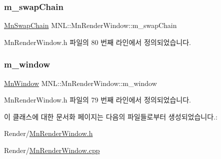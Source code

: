 \subsubsection{\texorpdfstring{m\+\_\+swap\+Chain}{m\_swapChain}}
{\footnotesize\ttfamily \hyperlink{class_m_n_l_1_1_mn_swap_chain}{Mn\+Swap\+Chain} M\+N\+L\+::\+Mn\+Render\+Window\+::m\+\_\+swap\+Chain\hspace{0.3cm}{\ttfamily [private]}}



Mn\+Render\+Window.\+h 파일의 80 번째 라인에서 정의되었습니다.

\mbox{\label{class_m_n_l_1_1_mn_render_window_a15bf07a3fc82d20ef185cf140b7c216e}} 
\subsubsection{\texorpdfstring{m\+\_\+window}{m\_window}}
{\footnotesize\ttfamily \hyperlink{class_m_n_l_1_1_mn_window}{Mn\+Window} M\+N\+L\+::\+Mn\+Render\+Window\+::m\+\_\+window\hspace{0.3cm}{\ttfamily [private]}}



Mn\+Render\+Window.\+h 파일의 79 번째 라인에서 정의되었습니다.



이 클래스에 대한 문서화 페이지는 다음의 파일들로부터 생성되었습니다.\+:\begin{DoxyCompactItemize}
\item 
Render/\hyperlink{_mn_render_window_8h}{Mn\+Render\+Window.\+h}\item 
Render/\hyperlink{_mn_render_window_8cpp}{Mn\+Render\+Window.\+cpp}\end{DoxyCompactItemize}
